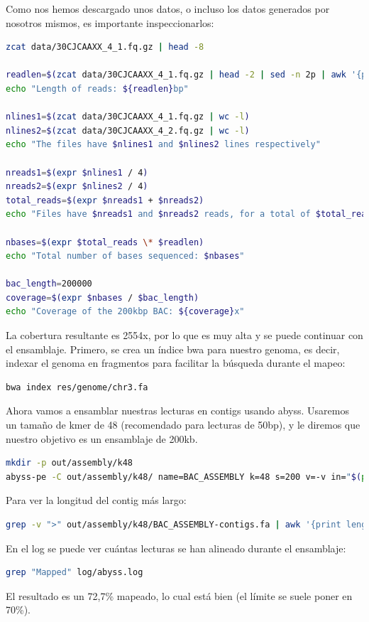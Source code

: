 Como nos hemos descargado unos datos, o incluso los datos generados por nosotros mismos, es importante inspeccionarlos: 
\begin{lstlisting}[language=bash]
zcat data/30CJCAAXX_4_1.fq.gz | head -8

readlen=$(zcat data/30CJCAAXX_4_1.fq.gz | head -2 | sed -n 2p | awk '{print length}')
echo "Length of reads: ${readlen}bp"

nlines1=$(zcat data/30CJCAAXX_4_1.fq.gz | wc -l)
nlines2=$(zcat data/30CJCAAXX_4_2.fq.gz | wc -l)
echo "The files have $nlines1 and $nlines2 lines respectively"

nreads1=$(expr $nlines1 / 4)
nreads2=$(expr $nlines2 / 4)
total_reads=$(expr $nreads1 + $nreads2)
echo "Files have $nreads1 and $nreads2 reads, for a total of $total_reads"

nbases=$(expr $total_reads \* $readlen)
echo "Total number of bases sequenced: $nbases"

bac_length=200000
coverage=$(expr $nbases / $bac_length)
echo "Coverage of the 200kbp BAC: ${coverage}x"
\end{lstlisting}

La cobertura resultante es 2554x, por lo que es muy alta y se puede continuar con el ensamblaje. Primero, se crea un índice bwa para nuestro genoma, es decir, indexar el genoma en fragmentos para facilitar la búsqueda durante el mapeo:
\begin{lstlisting}[language=bash]
bwa index res/genome/chr3.fa
\end{lstlisting}

Ahora vamos a ensamblar nuestras lecturas en contigs usando abyss.
Usaremos un tamaño de kmer de 48 (recomendado para lecturas de 50bp), y le diremos que nuestro objetivo es un ensamblaje de 200kb.
\begin{lstlisting}[language=bash]
mkdir -p out/assembly/k48
abyss-pe -C out/assembly/k48/ name=BAC_ASSEMBLY k=48 s=200 v=-v in="$(pwd)/data/30CJCAAXX_4_1.fq.gz $(pwd)/data/30CJCAAXX_4_2.fq.gz" contigs 2>&1 | tee log/abyss.log
\end{lstlisting}

Para ver la longitud del contig más largo:
\begin{lstlisting}[language=bash]
grep -v ">" out/assembly/k48/BAC_ASSEMBLY-contigs.fa | awk '{print length}' | sort -n | tail -1
\end{lstlisting}

En el log se puede ver cuántas lecturas se han alineado durante el ensamblaje:
\begin{lstlisting}[language=bash]
grep "Mapped" log/abyss.log
\end{lstlisting}
El resultado es un 72,7\% mapeado, lo cual está bien (el límite se suele poner en 70\%).

